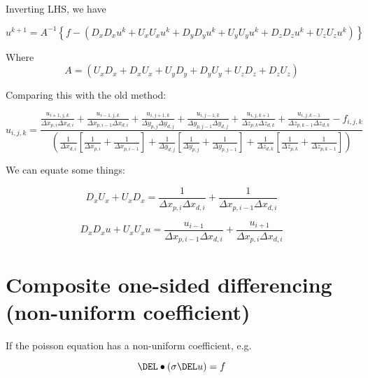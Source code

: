 \documentclass[11pt]{article}
\begin{document}
Inverting LHS, we have

\begin{equation}
	u^{k+1}
	=
	A^{-1}
	\left\{
	f -
	(
	D_x D_x u^k +
	U_x U_x u^k +
	D_y D_y u^k +
	U_y U_y u^k +
	D_z D_z u^k +
	U_z U_z u^k
	)
	\right\}
\end{equation}

Where
\begin{equation}
	A
	=
	(
	U_x D_x + D_x U_x +
	U_y D_y + D_y U_y +
	U_z D_z + D_z U_z
	)
\end{equation}


Comparing this with the old method:

\begin{equation}
	u_{i,j,k} =
	\frac{
	\frac{u_{i+1,j,k}}{\Delta x_{p,i} \Delta x_{d,i}} + \frac{u_{i-1,j,k}}{\Delta x_{p,i-1} \Delta x_{d,i}} +
	\frac{u_{i,j+1,k}}{\Delta y_{p,j} \Delta y_{d,j}} + \frac{u_{i,j-1,k}}{\Delta y_{p,j-1} \Delta y_{d,j}} +
	\frac{u_{i,j,k+1}}{\Delta z_{p,k} \Delta z_{d,k}} + \frac{u_{i,j,k-1}}{\Delta z_{p,k-1} \Delta z_{d,k}}
	- f_{i,j,k} }{
	\left(
	\frac{ 1 }{ \Delta x_{d,i} }
	\left[
	\frac{ 1 }{ \Delta x_{p,i} } +
	\frac{ 1 }{ \Delta x_{p,i-1} }
	\right] +
	\frac{ 1 }{ \Delta y_{d,j} }
	\left[
	\frac{ 1 }{ \Delta y_{p,j} } +
	\frac{ 1 }{ \Delta y_{p,j-1} }
	\right] +
	\frac{ 1 }{ \Delta z_{d,k} }
	\left[
	\frac{ 1 }{ \Delta z_{p,k} } +
	\frac{ 1 }{ \Delta z_{p,k-1} }
	\right]
	\right)
	}
\end{equation}

We can equate some things:

\begin{equation}
	D_x U_x +
	U_x D_x
	=
	\frac{1}{\Delta x_{p,i} \Delta x_{d,i}}
	+
	\frac{1}{\Delta x_{p,i-1} \Delta x_{d,i}}
\end{equation}

\begin{equation}
	D_x D_x u +
	U_x U_x u
	=
	\frac{u_{i-1}}{\Delta x_{p,i-1} \Delta x_{d,i}}
	+
	\frac{u_{i+1}}{\Delta x_{p,i} \Delta x_{d,i}}
\end{equation}

\section{Composite one-sided differencing (non-uniform coefficient)}

If the poisson equation has a non-uniform coefficient, e.g.

\begin{equation}
	\DEL \bullet \left( \sigma \DEL u \right) = f
\end{equation}
\end{document}
